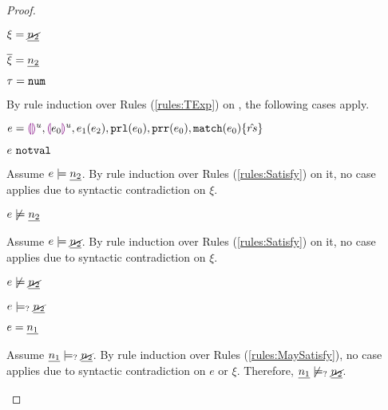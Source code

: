 \begin{proof}
\begin{byCases}
\item[\text{(\ref{rule:CTNotNum})}]
    \begin{pfsteps*}
    \item $\xi=\underline{\cancel{n_2}}$ 
    \item $\overline{\xi}=\underline{n_2}$ 
    \item $\tau=\mathtt{num}$ 
    \end{pfsteps*}
    By rule induction over Rules (\ref{rules:TExp}) on , the following cases apply.
    \begin{byCases}
    \item[\text{(\ref{rule:TEHole}),(\ref{rule:THole}),(\ref{rule:TAp}),(\ref{rule:TPrl}),(\ref{rule:TPrr}),(\ref{rule:TMatchZPre}),(\ref{rule:TMatchNZPre})}]
        \begin{pfsteps*}
        \item $e=\textcolor{violet}{\llparenthesis}\textcolor{violet}{\rrparenthesis}^{u},\textcolor{violet}{\llparenthesis} e_0\textcolor{violet}{\rrparenthesis}^{u},e_1(e_2),\mathtt{prl}(e_0),\mathtt{prr}(e_0),\mathtt{match}(e_0) \{\hat{rs}\}$ 
         \item $e ~\mathtt{notval}$  
        \end{pfsteps*}
        Assume $e \models \underline{n_2}$. By rule induction over Rules (\ref{rules:Satisfy}) on it, no case applies due to syntactic contradiction on $\xi$.
        \begin{pfsteps*}
        \item $e \not\models \underline{n_2}$  
        \end{pfsteps*}
        Assume $e \models \underline{\cancel{n_2}}$. By rule induction over Rules (\ref{rules:Satisfy}) on it, no case applies due to syntactic contradiction on $\xi$.
        \begin{pfsteps*}
        \item $e \not\models \underline{\cancel{n_2}}$  
        \item $e \models_{?} \underline{\cancel{n_2}}$ 
        \end{pfsteps*}
    \item[\text{(\ref{rule:TNum})}]
        \begin{pfsteps*}
        \item $e=\underline{n_1}$ 
        \end{pfsteps*}
        Assume $\underline{n_1} \models_{?} \underline{\cancel{n_2}}$. By rule induction over Rules (\ref{rules:MaySatisfy}), no case applies due to syntactic contradiction on $e$ or $\xi$.
        Therefore, $\underline{n_1} \not\models_{?} \underline{\cancel{n_2}}$.
        

\end{byCases}
\end{byCases}
\end{proof}
